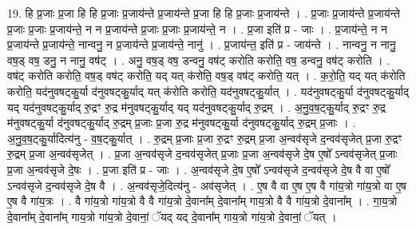 \documentclass[17pt]{extarticle}
\begin{document}
19. हि प्र॒जाः प्र॒जा हि हि प्र॒जाः प्र॒जाय॑न्ते प्र॒जाय॑न्ते प्र॒जा हि हि प्र॒जाः प्र॒जाय॑न्ते । . प्र॒जाः प्र॒जाय॑न्ते प्र॒जाय॑न्ते प्र॒जाः प्र॒जाः प्र॒जाय॑न्ते॒ न न प्र॒जाय॑न्ते प्र॒जाः प्र॒जाः प्र॒जाय॑न्ते॒ न । . प्र॒जा इति॑ प्र - जाः । . प्र॒जाय॑न्ते॒ न न प्र॒जाय॑न्ते प्र॒जाय॑न्ते॒ नान्वनु॒ न प्र॒जाय॑न्ते प्र॒जाय॑न्ते॒ नानु॑ । . प्र॒जाय॑न्त॒ इति॑ प्र - जाय॑न्ते । . नान्वनु॒ न नानु॒ वष॒ड् वष॒ डनु॒ न नानु॒ वष॑ट् । . अनु॒ वष॒ड् वष॒ डन्वनु॒ वष॑ट् करोति करोति॒ वष॒ डन्वनु॒ वष॑ट् करोति । . वष॑ट् करोति करोति॒ वष॒ड् वष॑ट् करोति॒ यद् यत् क॑रोति॒ वष॒ड् वष॑ट् करोति॒ यत् । . क॒रो॒ति॒ यद् यत् क॑रोति करोति॒ यद॑नुवषट्कु॒र्या द॑नुवषट्कु॒र्याद् यत् क॑रोति करोति॒ यद॑नुवषट्कु॒र्यात् । . यद॑नुवषट्कु॒र्या द॑नुवषट्कु॒र्याद् यद् यद॑नुवषट्कु॒र्याद् रु॒द्रꣳ रु॒द्र म॑नुवषट्कु॒र्याद् यद् यद॑नुवषट्कु॒र्याद् रु॒द्रम् । . अ॒नु॒व॒ष॒ट्कु॒र्याद् रु॒द्रꣳ रु॒द्र म॑नुवषट्कु॒र्या द॑नुवषट्कु॒र्याद् रु॒द्रम् प्र॒जाः प्र॒जा रु॒द्र म॑नुवषट्कु॒र्या द॑नुवषट्कु॒र्याद् रु॒द्रम् प्र॒जाः । . अ॒नु॒व॒ष॒ट्कु॒र्यादित्य॑नु - व॒ष॒ट्कु॒र्यात् । . रु॒द्रम् प्र॒जाः प्र॒जा रु॒द्रꣳ रु॒द्रम् प्र॒जा अ॒न्वव॑सृजे द॒न्वव॑सृजेत् प्र॒जा रु॒द्रꣳ रु॒द्रम् प्र॒जा अ॒न्वव॑सृजेत् । . प्र॒जा अ॒न्वव॑सृजे द॒न्वव॑सृजेत् प्र॒जाः प्र॒जा अ॒न्वव॑सृजे दे॒ष ए॒षो᳚ ऽन्वव॑सृजेत् प्र॒जाः प्र॒जा अ॒न्वव॑सृजे दे॒षः । . प्र॒जा इति॑ प्र - जाः । . अ॒न्वव॑सृजे दे॒ष ए॒षो᳚ ऽन्वव॑सृजे द॒न्वव॑सृजे दे॒ष वै वा ए॒षो᳚ ऽन्वव॑सृजे द॒न्वव॑सृजे दे॒ष वै । . अ॒न्वव॑सृजे॒दित्य॑नु - अव॑सृजेत् । . ए॒ष वै वा ए॒ष ए॒ष वै गा॑य॒त्रो गा॑य॒त्रो वा ए॒ष ए॒ष वै गा॑य॒त्रः । . वै गा॑य॒त्रो गा॑य॒त्रो वै वै गा॑य॒त्रो दे॒वाना᳚म् दे॒वाना᳚म् गाय॒त्रो वै वै गा॑य॒त्रो दे॒वाना᳚म् । . गा॒य॒त्रो दे॒वाना᳚म् दे॒वाना᳚म् गाय॒त्रो गा॑य॒त्रो दे॒वानां॒ ॅयद् यद् दे॒वाना᳚म् गाय॒त्रो गा॑य॒त्रो दे॒वानां॒ ॅयत् । \newline
\end{document}
